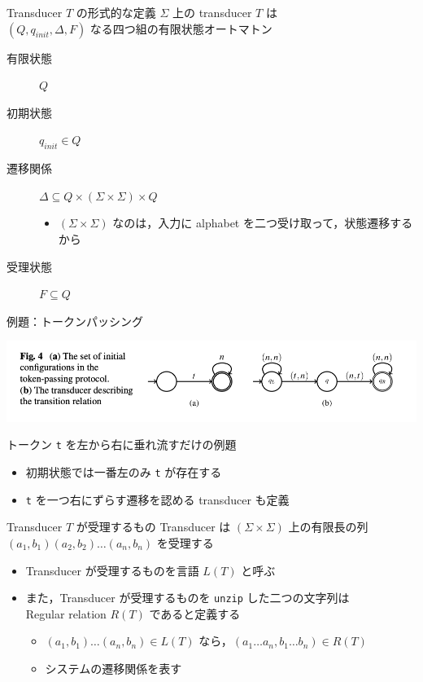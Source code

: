 \documentclass[presentation, xetex]{beamer}
\begin{document}
\begin{frame}[label={sec:org18574a2}]{Transducer \(T\) の形式的な定義}
\(\Sigma\) 上の transducer \(T\) は \\
\((Q, q_{init}, \Delta, F)\) なる四つ組の有限状態オートマトン
\begin{description}
\item[{有限状態}] \(Q\)
\item[{初期状態}] \(q_{init} \in Q\)
\item[{遷移関係}] \(\Delta \subseteq Q \times (\Sigma \times \Sigma) \times Q\)
\begin{itemize}
\item \((\Sigma \times \Sigma)\) なのは，入力に alphabet を二つ受け取って，状態遷移するから
\end{itemize}
\item[{受理状態}] \(F \subseteq Q\)
\end{description}
\end{frame}



\begin{frame}[label={sec:org5ba6bcd},fragile]{例題：トークンパッシング}
 \begin{center}
\includegraphics[width=.9\linewidth]{./images/token-example.png}
\end{center}


トークン \texttt{t} を左から右に垂れ流すだけの例題
\begin{itemize}
\item 初期状態では一番左のみ \texttt{t} が存在する
\item \texttt{t} を一つ右にずらす遷移を認める transducer も定義
\end{itemize}
\end{frame}



\begin{frame}[label={sec:org91d7a9f},fragile]{Transducer \(T\) が受理するもの}
 Transducer は \((\Sigma \times \Sigma)\) 上の有限長の列 \\
\((a_1, b_1)(a_2, b_2) \dots (a_n, b_n)\) を受理する
\begin{itemize}
\item Transducer が受理するものを言語 \(L(T)\) と呼ぶ
\item また，Transducer が受理するものを \texttt{unzip} した二つの文字列は \\
Regular relation \(R(T)\) であると定義する
\begin{itemize}
\item \((a_1, b_1) \dots (a_n, b_n) \in L(T)\) なら，\((a_1 \dots a_n, b_1 \dots b_n) \in R(T)\)
\item システムの遷移関係を表す
\end{itemize}
\end{itemize}
\end{frame}
\end{document}
